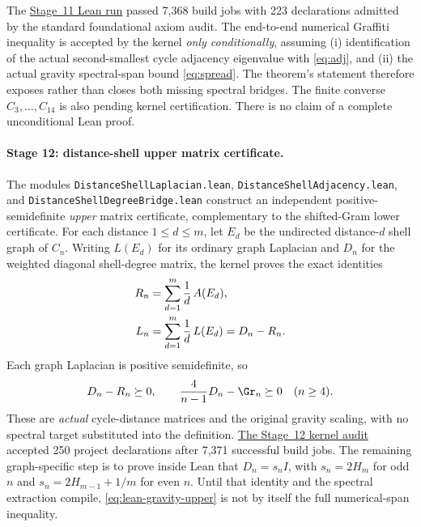 The \href{https://github.com/tonynewton79-web/newton-400-conjectures/actions/runs/39151152516}{Stage~11 Lean run}
passed 7,368 build jobs with 223 declarations admitted by the
standard foundational axiom audit. The end-to-end numerical
Graffiti inequality is accepted by the kernel \emph{only
conditionally}, assuming (i) identification of the actual
second-smallest cycle adjacency eigenvalue with
\eqref{eq:adj}, and (ii) the actual gravity spectral-span
bound \eqref{eq:spread}. The theorem's statement therefore
exposes rather than closes both missing spectral bridges.
The finite converse $C_3,\ldots,C_{14}$ is also pending
kernel certification. There is no claim of a complete
unconditional Lean proof.


\paragraph{Stage 12: distance-shell upper matrix certificate.}
The modules \texttt{DistanceShellLaplacian.lean},
\texttt{DistanceShellAdjacency.lean}, and
\texttt{DistanceShellDegreeBridge.lean} construct an
independent positive-semidefinite \emph{upper} matrix
certificate, complementary to the shifted-Gram lower
certificate. For each distance $1\le d\le m$, let
$E_d$ be the undirected distance-$d$ shell graph of $C_n$.
Writing $L(E_d)$ for its ordinary graph Laplacian and
$D_n$ for the weighted diagonal shell-degree matrix,
the kernel proves the exact identities
\begin{align}\label{eq:lean-laplacian}
R_n&=\sum_{d=1}^m\frac1d\,A(E_d),\notag\\
L_n&=\sum_{d=1}^m\frac1d\,L(E_d)=D_n-R_n.
\end{align}
Each graph Laplacian is positive semidefinite, so
\begin{equation}\label{eq:lean-gravity-upper}
D_n-R_n\succeq0,\qquad
\frac4{n-1}D_n-\Gr_n\succeq0\quad(n\ge4).
\end{equation}
These are \emph{actual} cycle-distance matrices and
the original gravity scaling, with no spectral target
substituted into the definition.
\href{https://github.com/tonynewton79-web/newton-400-conjectures/actions/runs/39153984478}{The Stage~12 kernel audit}
accepted 250 project declarations after 7,371 successful
build jobs. The remaining graph-specific step is to
prove inside Lean that $D_n=s_n I$, with
$s_n=2H_m$ for odd $n$ and
$s_n=2H_{m-1}+1/m$ for even $n$. Until that identity
and the spectral extraction compile, \eqref{eq:lean-gravity-upper}
is not by itself the full numerical-span inequality.



